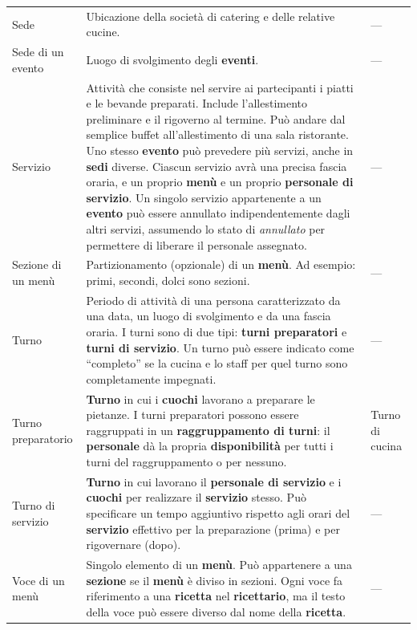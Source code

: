 \begin{longtable}{L{3.5cm} L{8.5cm} L{3cm}}
Sede
& Ubicazione della società di catering e delle relative cucine.
& — \\
\addlinespace

Sede di un evento
& Luogo di svolgimento degli \textbf{eventi}.
& — \\
\addlinespace

Servizio
& Attività che consiste nel servire ai partecipanti i piatti e le bevande
  preparati. Include l'allestimento preliminare e il rigoverno al termine.
  Può andare dal semplice buffet all'allestimento di una sala ristorante.
  Uno stesso \textbf{evento} può prevedere più servizi, anche in
  \textbf{sedi} diverse. Ciascun servizio avrà una precisa fascia oraria,
  e un proprio \textbf{menù} e un proprio \textbf{personale di servizio}.
  Un singolo servizio appartenente a un \textbf{evento} può essere
  annullato indipendentemente dagli altri servizi, assumendo lo stato di
  \emph{annullato} per permettere di liberare il personale assegnato.
& — \\
\addlinespace

Sezione di un menù
& Partizionamento (opzionale) di un \textbf{menù}. Ad esempio: primi,
  secondi, dolci sono sezioni.
& — \\
\addlinespace

Turno
& Periodo di attività di una persona caratterizzato da una data, un luogo di
  svolgimento e da una fascia oraria. I turni sono di due tipi:
  \textbf{turni preparatori} e \textbf{turni di servizio}. Un turno può
  essere indicato come ``completo'' se la cucina e lo staff per quel turno
  sono completamente impegnati.
& — \\
\addlinespace

Turno preparatorio
& \textbf{Turno} in cui i \textbf{cuochi} lavorano a preparare le pietanze.
  I turni preparatori possono essere raggruppati in un
  \textbf{raggruppamento di turni}: il \textbf{personale} dà la propria
  \textbf{disponibilità} per tutti i turni del raggruppamento o per nessuno.
& Turno di cucina \\
\addlinespace

Turno di servizio
& \textbf{Turno} in cui lavorano il \textbf{personale di servizio} e i
  \textbf{cuochi} per realizzare il \textbf{servizio} stesso. Può
  specificare un tempo aggiuntivo rispetto agli orari del \textbf{servizio}
  effettivo per la preparazione (prima) e per rigovernare (dopo).
& — \\
\addlinespace

Voce di un menù
& Singolo elemento di un \textbf{menù}. Può appartenere a una \textbf{sezione}
  se il \textbf{menù} è diviso in sezioni. Ogni voce fa riferimento a una
  \textbf{ricetta} nel \textbf{ricettario}, ma il testo della voce può essere
  diverso dal nome della \textbf{ricetta}.
& — \\

\end{longtable}
